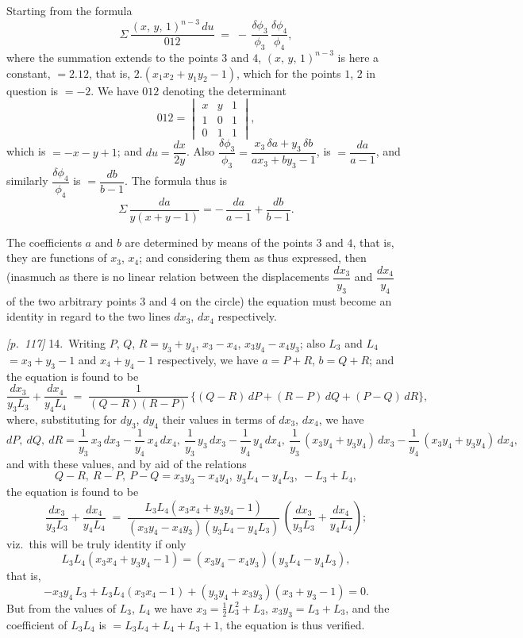\documentclass[11pt,a4paper]{article}
\theoremstyle{plain}
\theoremstyle{definition}
\theoremstyle{remark}
\begin{document}
Starting from the formula
\[
\Sigma\,\frac{(x,\,y,\,1)^{n-3}\,du}{012}
\;=\; -\,\frac{\delta\phi_3}{\phi_3}\,\frac{\delta\phi_4}{\phi_4},
\]
where the summation extends to the points $3$ and $4$, $(x,\,y,\,1)^{n-3}$ is here a constant, $= 2.12$, that is, $2.(x_1x_2 + y_1y_2 - 1)$, which for the points $1$, $2$ in question is $= -2$. We have $012$ denoting the determinant
\[
012 = \begin{vmatrix} x & y & 1 \\ 1 & 0 & 1 \\ 0 & 1 & 1 \end{vmatrix},
\]
which is $= -x - y + 1$; and $du = \dfrac{dx}{2y}$. Also $\dfrac{\delta\phi_3}{\phi_3} = \dfrac{x_3\,\delta a + y_3\,\delta b}{ax_3 + by_3 - 1}$, is $= \dfrac{da}{a - 1}$, and similarly $\dfrac{\delta\phi_4}{\phi_4}$ is $= \dfrac{db}{b - 1}$. The formula thus is
\[
\Sigma\,\frac{da}{y(x + y - 1)} = -\,\frac{da}{a - 1} + \frac{db}{b - 1}.
\]

The coefficients $a$ and $b$ are determined by means of the points $3$ and $4$, that is, they are functions of $x_3$, $x_4$; and considering them as thus expressed, then (inasmuch as there is no linear relation between the displacements $\dfrac{dx_3}{y_3}$ and $\dfrac{dx_4}{y_4}$ of the two arbitrary points $3$ and $4$ on the circle) the equation must become an identity in regard to the two lines $dx_3$, $dx_4$ respectively.

\noindent\textit{[p.~117]} 14.\ Writing $P$, $Q$, $R = y_3 + y_4$, $x_3 - x_4$, $x_3 y_4 - x_4 y_3$; also $L_3$ and $L_4$ $= x_3 + y_3 - 1$ and $x_4 + y_4 - 1$ respectively, we have $a = P + R$, $b = Q + R$; and the equation is found to be
\[
\frac{dx_3}{y_3 L_3} + \frac{dx_4}{y_4 L_4}
\;=\; \frac{1}{(Q - R)(R - P)}\,\{(Q - R)\,dP + (R - P)\,dQ + (P - Q)\,dR\},
\]
where, substituting for $dy_3$, $dy_4$ their values in terms of $dx_3$, $dx_4$, we have
\[
dP,\ dQ,\ dR = \frac{1}{y_3}\,x_3\,dx_3 - \frac{1}{y_4}\,x_4\,dx_4,\ \frac{1}{y_3}\,y_3\,dx_3 - \frac{1}{y_4}\,y_4\,dx_4,\ \frac{1}{y_3}\,(x_3 y_4 + y_3 y_4)\,dx_3 - \frac{1}{y_4}\,(x_3 y_4 + y_3 y_4)\,dx_4,
\]
and with these values, and by aid of the relations
\[
Q - R,\ R - P,\ P - Q = x_3 y_3 - x_4 y_4,\ y_3 L_4 - y_4 L_3,\ -L_3 + L_4,
\]
the equation is found to be
\[
\frac{dx_3}{y_3 L_3} + \frac{dx_4}{y_4 L_4}
\;=\; \frac{L_3 L_4 (x_3 x_4 + y_3 y_4 - 1)}{(x_3 y_4 - x_4 y_3)(y_3 L_4 - y_4 L_3)}\,\left(\frac{dx_3}{y_3 L_3} + \frac{dx_4}{y_4 L_4}\right);
\]
viz.\ this will be truly identity if only
\[
L_3 L_4 (x_3 x_4 + y_3 y_4 - 1) = (x_3 y_4 - x_4 y_3)(y_3 L_4 - y_4 L_3),
\]
that is,
\[
- x_3 y_4\,L_3 + L_3 L_4 (x_3 x_4 - 1) + (y_3 y_4 + x_3 y_3)(x_3 + y_3 - 1) = 0.
\]
But from the values of $L_3$, $L_4$ we have $x_3 = \tfrac{1}{2} L_3^2 + L_3$, $x_3 y_3 = L_3 + L_3$, and the coefficient of $L_3 L_4$ is $= L_3 L_4 + L_4 + L_3 + 1$, the equation is thus verified.
\end{document}
